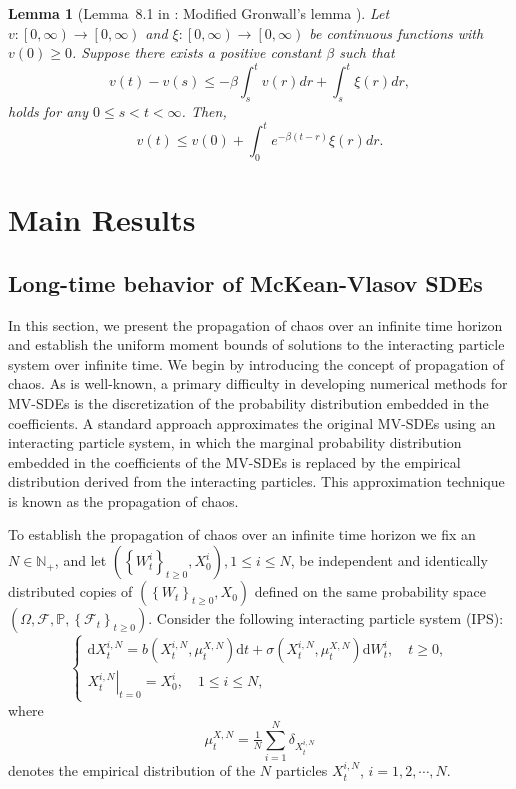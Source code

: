 \documentclass[12pt]{article}
\numberwithin{equation}{section}
\newtheorem{lemma}[assumption]{Lemma}
\begin{document}
\begin{lemma}[Lemma~8.1 in \cite{KIto1964numericalstationarysolutions}: Modified Gronwall's lemma ]\label{lem:Gronwalllemma}
Let $v: \left[0, \infty\right) \to \left[0, \infty\right)$ and $\xi: \left[0, \infty\right) \to \left[0, \infty\right)$ be continuous functions with $v\left(0\right) \geq 0$. Suppose there exists a positive constant $\beta$ such that
\begin{equation}\tag{2.18}\label{2.18}
v\left(t\right)-v\left(s\right) \leq-\beta \int_s^t v\left(r\right) d r+\int_s^t \xi\left(r\right) d r,
\end{equation}
holds for any $0 \leq s < t < \infty$. Then,
\begin{equation}\tag{2.19}\label{2.19}
v\left(t\right) \leq v\left(0\right)+\int_0^t e^{-\beta\left(t-r\right)} \xi\left(r\right) d r.
\end{equation}
\end{lemma}
\section{Main Results}
\subsection{Long-time behavior of McKean-Vlasov SDEs}\label{Long-time behavior of McKean-Vlasov SDEs}
In this section, we present the propagation of chaos over an infinite time horizon and establish the uniform moment bounds of solutions to the interacting particle system over infinite time. We begin by introducing the concept of propagation of chaos. As is well-known, a  primary difficulty in developing numerical methods for MV-SDEs is the discretization of the probability distribution embedded in the coefficients. A standard approach approximates the original MV-SDEs using an interacting particle system, in which the marginal probability distribution embedded in the coefficients of the MV-SDEs is replaced by the empirical distribution derived from the interacting particles. This approximation technique is known as the propagation of chaos.

 To establish the propagation of chaos over an infinite time horizon we  fix an $N \in \mathbb{N}_{+}$, and let $\left(\left\{W_t^i\right\}_{t \geq 0}, X_0^i\right), 1 \leq i \leq N$,  be independent and identically distributed copies of  $\left(\left\{W_t\right\}_{t \geq 0}, X_0\right)$ defined on the same probability space $\left(\Omega, \mathcal{F}, \mathbb{P},\left\{\mathcal{F}_t\right\}_{t \geq 0}\right)$. Consider the following interacting particle system (IPS):
\begin{equation}\tag{3.1}\label{interacting}
    \left\{\begin{array}{l}
\mathrm{d} X_t^{i, N}=b\left(X_t^{i, N}, \mu_t^{X, N}\right) \mathrm{d} t+\sigma\left(X_t^{i, N}, \mu_t^{X, N}\right) \mathrm{d} W_t^i, \quad t \geq 0, \\
\left.X_t^{i, N}\right|_{t=0}=X_0^i, \quad 1 \leq i \leq N,
\end{array}\right.
\end{equation}
where
$$
\mu_t^{X, N}=\tfrac{1}{N} \sum_{i=1}^N \delta_{X_t^{i, N}}
$$
denotes the empirical distribution of the $N$ particles $X_t^{i, N}$, $i=1,2, \cdots, N$.
\end{document}
